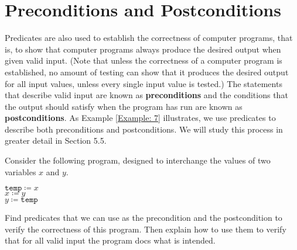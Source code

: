 \documentclass{Axon}
\begin{document}
\section{Preconditions and Postconditions}
Predicates are also used to establish the correctness of computer programs, that is, to show that computer programs always produce the desired output when given valid input. (Note that unless the correctness of a computer program is established, no amount of testing can show that it produces the desired output for all input values, unless every single input value is tested.) The statements that describe valid input are known as \textbf{preconditions} and the conditions that the output should satisfy when the program has run are known as \textbf{postconditions}. As Example \ref{Example: 7} illustrates, we use predicates to describe both preconditions and postconditions. We will study this process in greater detail in Section 5.5.

\begin{example}\label{Example: 7}
    Consider the following program, designed to interchange the values of two variables \(x\) and \(y\).
    
    \begin{center}
        \(\texttt{temp} \coloneq x\) \\
        \(x \coloneq y\)             \\
        \(y \coloneq \texttt{temp}\)
    \end{center}

    Find predicates that we can use as the precondition and the postcondition to verify the correctness of this program. Then explain how to use them to verify that for all valid input the program docs what is intended.    
\end{example}

\printbibliography
\end{document}
